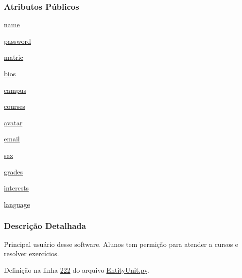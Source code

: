 \subsubsection*{Atributos Públicos}
\begin{DoxyCompactItemize}
\item 
\hyperlink{classELO_1_1EntityUnit_1_1Student_a33329ec1da0181f6305626b4444a8e0b}{name}
\item 
\hyperlink{classELO_1_1EntityUnit_1_1Student_a834cad492221bfe3f26e590666e13f9a}{password}
\item 
\hyperlink{classELO_1_1EntityUnit_1_1Student_a7a58dc9ae8d071372ef2036a82fcb3ae}{matric}
\item 
\hyperlink{classELO_1_1EntityUnit_1_1Student_a148e46f8d5bb2a3dedb9590edbb2471e}{bios}
\item 
\hyperlink{classELO_1_1EntityUnit_1_1Student_aeff51011a4e35705fb6aefc54e1d4f35}{campus}
\item 
\hyperlink{classELO_1_1EntityUnit_1_1Student_a4fc13f8b92b03ab40b6f97e753109056}{courses}
\item 
\hyperlink{classELO_1_1EntityUnit_1_1Student_a63479fe42a5a5e1dffc988221a807a6a}{avatar}
\item 
\hyperlink{classELO_1_1EntityUnit_1_1Student_ac072120adf3ee4078fe3ef7f17e61a1f}{email}
\item 
\hyperlink{classELO_1_1EntityUnit_1_1Student_a5ca85c1d00044512e5dc3cfabac4ff9f}{sex}
\item 
\hyperlink{classELO_1_1EntityUnit_1_1Student_a7ab2e46886024eced2bc61195dbc2008}{grades}
\item 
\hyperlink{classELO_1_1EntityUnit_1_1Student_a8777212f16975f658ff8f75e47f2c554}{interests}
\item 
\hyperlink{classELO_1_1EntityUnit_1_1Student_ad58a5d0f4e75b34e6c2b93ac05b59faf}{language}
\end{DoxyCompactItemize}


\subsubsection{Descrição Detalhada}
Principal usuário desse software. Alunos tem permição para atender a cursos e resolver exercícios. 

Definição na linha \hyperlink{EntityUnit_8py_source_l00222}{222} do arquivo \hyperlink{EntityUnit_8py_source}{Entity\-Unit.\-py}.



